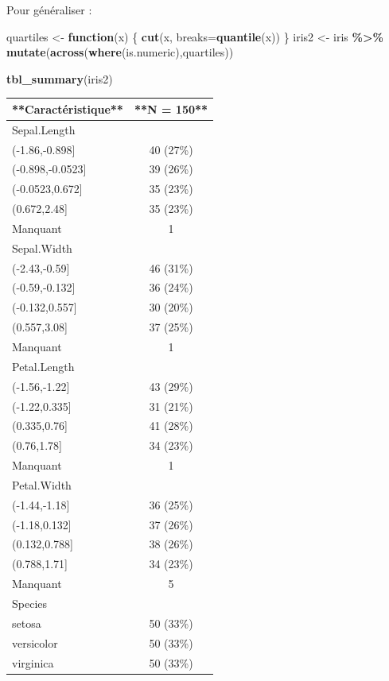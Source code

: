 \documentclass[
]{book}
\newenvironment{Shaded}{\begin{snugshade}}{\end{snugshade}}
\newcommand{\AttributeTok}[1]{\textcolor[rgb]{0.13,0.29,0.53}{#1}}
\newcommand{\ControlFlowTok}[1]{\textcolor[rgb]{0.13,0.29,0.53}{\textbf{#1}}}
\newcommand{\FunctionTok}[1]{\textcolor[rgb]{0.13,0.29,0.53}{\textbf{#1}}}
\newcommand{\NormalTok}[1]{#1}
\newcommand{\OtherTok}[1]{\textcolor[rgb]{0.56,0.35,0.01}{#1}}
\newcommand{\SpecialCharTok}[1]{\textcolor[rgb]{0.81,0.36,0.00}{\textbf{#1}}}
\begin{document}
Pour généraliser :

\begin{Shaded}
\begin{Highlighting}[]
\NormalTok{quartiles }\OtherTok{\textless{}{-}} \ControlFlowTok{function}\NormalTok{(x) \{}
  \FunctionTok{cut}\NormalTok{(x, }\AttributeTok{breaks=}\FunctionTok{quantile}\NormalTok{(x))}
\NormalTok{\}}
\NormalTok{iris2 }\OtherTok{\textless{}{-}}\NormalTok{ iris }\SpecialCharTok{\%\textgreater{}\%} \FunctionTok{mutate}\NormalTok{(}\FunctionTok{across}\NormalTok{(}\FunctionTok{where}\NormalTok{(is.numeric),quartiles))}
\end{Highlighting}
\end{Shaded}

\begin{Shaded}
\begin{Highlighting}[]
\FunctionTok{tbl\_summary}\NormalTok{(iris2)}
\end{Highlighting}
\end{Shaded}

\begin{tabular}{l|c}
\hline
**Caractéristique** & **N = 150**\\
\hline
Sepal.Length & \\
\hline
(-1.86,-0.898] & 40 (27\%)\\
\hline
(-0.898,-0.0523] & 39 (26\%)\\
\hline
(-0.0523,0.672] & 35 (23\%)\\
\hline
(0.672,2.48] & 35 (23\%)\\
\hline
Manquant & 1\\
\hline
Sepal.Width & \\
\hline
(-2.43,-0.59] & 46 (31\%)\\
\hline
(-0.59,-0.132] & 36 (24\%)\\
\hline
(-0.132,0.557] & 30 (20\%)\\
\hline
(0.557,3.08] & 37 (25\%)\\
\hline
Manquant & 1\\
\hline
Petal.Length & \\
\hline
(-1.56,-1.22] & 43 (29\%)\\
\hline
(-1.22,0.335] & 31 (21\%)\\
\hline
(0.335,0.76] & 41 (28\%)\\
\hline
(0.76,1.78] & 34 (23\%)\\
\hline
Manquant & 1\\
\hline
Petal.Width & \\
\hline
(-1.44,-1.18] & 36 (25\%)\\
\hline
(-1.18,0.132] & 37 (26\%)\\
\hline
(0.132,0.788] & 38 (26\%)\\
\hline
(0.788,1.71] & 34 (23\%)\\
\hline
Manquant & 5\\
\hline
Species & \\
\hline
setosa & 50 (33\%)\\
\hline
versicolor & 50 (33\%)\\
\hline
virginica & 50 (33\%)\\
\hline
\end{tabular}
\end{document}

